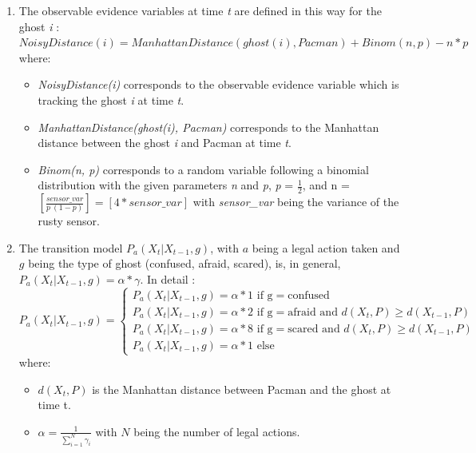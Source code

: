 \documentclass{article}
\newcommand\round[1]{\left[#1\right]}
\begin{document}
\begin{enumerate}[label=\alph*.,leftmargin=*]
    \item The observable evidence variables at time \textit{t} are defined in
    this way for the ghost \textit{i} : \\
    
    $NoisyDistance(i) = 
    ManhattanDistance(ghost(i), Pacman) + Binom(n, p) - n * p$ \\

    where:
    \begin{itemize}
    	\item \textit{NoisyDistance(i)} corresponds to the observable evidence variable 
    which is tracking the ghost \textit{i} at time \textit{t}.
    	\item \textit{ManhattanDistance(ghost(i), Pacman)} corresponds to the Manhattan distance between the ghost \textit{i} and Pacman at time \textit{t}.
    	\item \textit{Binom(n, p)} corresponds to a random variable following a binomial distribution with the given parameters
    \textit{n} and \textit{p}, \textit{p} = $\frac{1}{2}$, and n = $\round{\frac{sensor\_var}{p \ (1 - p)}} = \round{4 * sensor\_var}$ with \textit{sensor\_var} being the variance of the rusty sensor.
    \end{itemize}
    
    \item The transition model $P_a(X_t | X_{t-1}, g)$, with $a$ being a legal action taken and $g$ being the type of ghost (confused, afraid, scared), is, in general, $P_a(X_t | X_{t-1}, g) = \alpha * \gamma$. In detail :
    \[
  P_a(X_t | X_{t-1}, g)=\begin{cases}
               P_a(X_t | X_{t-1}, g) = \alpha * 1 \text{ if g} = \text{confused} \\
               P_a(X_t | X_{t-1}, g) = \alpha * 2 \text{ if g} = \text{afraid and }d(X_t, P) \geq d(X_{t-1},P) \\
               P_a(X_t | X_{t-1}, g) = \alpha * 8 \text{ if g} = \text{scared and }d(X_t, P) \geq d(X_{t-1},P) \\
               P_a(X_t | X_{t-1}, g) = \alpha * 1 \text{ else}
            \end{cases}
\]
where:
\begin{itemize}
	\item $d(X_t, P)$ is the Manhattan distance between Pacman and the ghost at time t.
	\item $\alpha = \frac{1}{\sum_{i=1}^N {\gamma_i}}$ with $N$ being the number of legal actions.
\end{itemize}

\end{enumerate}
\end{document}
